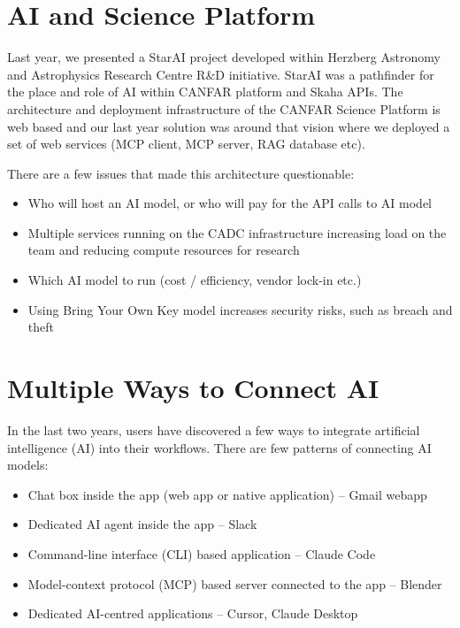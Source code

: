 \documentclass[11pt,twoside]{article}
\begin{document}
\section{AI and Science Platform}
Last year, we presented a StarAI project developed within Herzberg Astronomy and Astrophysics Research Centre R\&D initiative. StarAI was a pathfinder for the place and role of AI within CANFAR platform and Skaha APIs. The architecture and deployment infrastructure of the CANFAR Science Platform is web based and our last year solution was around that vision where we deployed a set of web services (MCP client, MCP server, RAG database etc).

\newpage 
{}

There are a few issues that made this architecture questionable:
\begin{itemize}
\item Who will host an AI model, or who will pay for the API calls to AI model
\item Multiple services running on the CADC infrastructure increasing load on the team and reducing compute resources for research
\item Which AI model to run (cost / efficiency, vendor lock-in etc.)
\item Using Bring Your Own Key model increases security risks, such as breach and theft
\end{itemize}

\section{Multiple Ways to Connect AI}
In the last two years, users have discovered a few ways to integrate artificial intelligence (AI) into their workflows. There are few patterns of connecting AI models:
\begin{itemize}
\item Chat box inside the app (web app or native application) -- Gmail webapp
\item Dedicated AI agent inside the app -- Slack
\item Command-line interface (CLI)  based application -- Claude Code
\item Model-context protocol (MCP) based server connected to the app -- Blender
\item Dedicated AI-centred applications -- Cursor,  Claude Desktop
\end{itemize}
\end{document}
